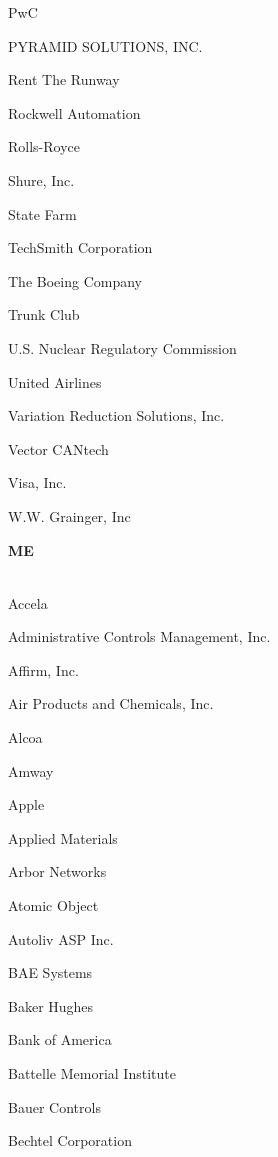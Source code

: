 \documentclass[twoside]{article}
\begin{document}
\begin{center}
\begin{multicols}{5}
\begin{FlushLeft}
\begin{compactitem}
\item PwC
\item PYRAMID SOLUTIONS, INC.
\item Rent The Runway
\item Rockwell Automation
\item Rolls-Royce
\item Shure, Inc.
\item State Farm
\item TechSmith Corporation
\item The Boeing Company
\item Trunk Club
\item U.S. Nuclear Regulatory Commission
\item United Airlines
\item Variation Reduction Solutions, Inc.
\item Vector CANtech
\item Visa, Inc.
\item W.W. Grainger, Inc
\end{compactitem}
        \end{FlushLeft}
        \vspace{1em}
        {\fontsize{14}{16}\selectfont \bf ME}\\
        \vspace{-1em}
        ~\hrulefill~
        \vspace{-.9em}
        \begin{FlushLeft}
        \begin{compactitem}
        \item Accela
\item Administrative Controls Management, Inc.
\item Affirm, Inc.
\item Air Products and Chemicals, Inc.
\item Alcoa
\item Amway
\item Apple
\item Applied Materials
\item Arbor Networks
\item Atomic Object
\item Autoliv ASP Inc.
\item BAE Systems
\item Baker Hughes
\item Bank of America
\item Battelle Memorial Institute
\item Bauer Controls
\item Bechtel Corporation

\end{compactitem}
\end{FlushLeft}
\end{multicols}
\end{center}
\end{document}
